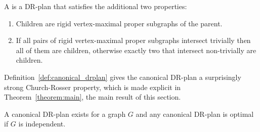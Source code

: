 \begin{definition}
\label{def:canonical_drplan}
    A  is a DR-plan that satisfies the additional two properties:
    \begin{enumerate}
        \item \label{def:canonical_drplan:prop1} Children are rigid vertex-maximal proper subgraphs of the parent.
        \item \label{def:canonical_drplan:prop2} If all pairs of rigid vertex-maximal proper subgraphs intersect trivially then all of them are children, otherwise exactly two that intersect non-trivially are children.
    \end{enumerate}
\end{definition}



Definition~\ref{def:canonical_drplan} gives the canonical DR-plan a surprisingly strong Church-Rosser property, which is made explicit in Theorem~\ref{theorem:main}, the main result of this section.

\begin{theorem}
\label{theorem:canonical_exists_and_is_optimal}
\label{theorem:canonical_is_optimal}
\label{theorem:main}
    A canonical DR-plan exists for a graph $G$ and any canonical DR-plan is optimal if $G$ is independent.
\end{theorem}






